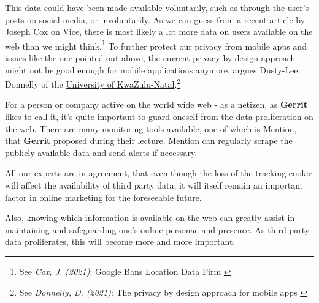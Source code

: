 This data could have been made available voluntarily, such as through the user's posts on social media, or involuntarily. As we can guess from a recent article by Joseph Cox on \href{https://www.vice.com/en}{Vice}, there is most likely a lot more data on users available on the web than we might think.\footnote{See \textit{Cox, J. (2021)}: Google Bans Location Data Firm \cite{locationBan}} To further protect our privacy from mobile apps and issues like the one pointed out above, the current privacy-by-design approach might not be good enough for mobile applications anymore, argues Dusty-Lee Donnelly of the \href{https://ukzn.ac.za/}{University of KwaZulu-Natal}.\footnote{See \textit{Donnelly, D. (2021)}: The privacy by design approach for mobile apps \cite{privacyDesign}}

For a person or company active on the world wide web - as a netizen, as \textbf{Gerrit} likes to call it, it's quite important to guard oneself from the data proliferation on the web. There are many monitoring tools available, one of which is \href{https://mention.com/en/}{Mention}, that \textbf{Gerrit} proposed during their lecture. Mention can regularly scrape the publicly available data and send alerts if necessary. 

All our experts are in agreement, that even though the loss of the tracking cookie will affect the availability of third party data, it will itself remain an important factor in online marketing for the foreseeable future. 

Also, knowing which information is available on the web can greatly assist in maintaining and safeguarding one's online personae and presence. As third party data proliferates, this will become more and more important.
